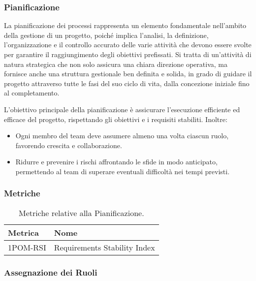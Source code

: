 \subsubsection{Pianificazione}

La pianificazione dei processi rappresenta un elemento fondamentale nell'ambito della gestione di un progetto, poiché implica l'analisi, la definizione, l'organizzazione e il controllo accurato delle varie attività che devono essere svolte per garantire il raggiungimento degli obiettivi prefissati. Si tratta di un'attività di natura strategica che non solo assicura una chiara direzione operativa, ma fornisce anche una struttura gestionale ben definita e solida, in grado di guidare il progetto attraverso tutte le fasi del suo ciclo di vita, dalla concezione iniziale fino al completamento.

L’obiettivo principale della pianificazione è assicurare l'esecuzione efficiente ed efficace del progetto, rispettando gli obiettivi e i requisiti stabiliti. Inoltre:
\begin{itemize}
    \item Ogni membro del team deve assumere almeno una volta ciascun ruolo, favorendo crescita e collaborazione.
    \item Ridurre e prevenire i rischi affrontando le sfide in modo anticipato, permettendo al team di superare eventuali difficoltà nei tempi previsti.
\end{itemize}

\subsubsection{Metriche}
\begin{table}[h!]
    \centering
    \renewcommand{\arraystretch}{1.5}
    \begin{tabular}{|l|l|}
        \hline
        \textbf{Metrica} & \textbf{Nome} \\
        \hline
        1POM-RSI & Requirements Stability Index \\
        \hline
    \end{tabular}
    \caption{Metriche relative alla Pianificazione.}
\end{table}

\subsubsection{Assegnazione dei Ruoli}


